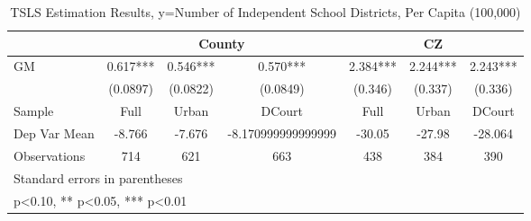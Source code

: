 \begin{table}[htbp]\centering
\def\sym#1{\ifmmode^{#1}\else\(^{#1}\)\fi}
\caption{TSLS Estimation Results, y=Number of Independent School Districts, Per Capita (100,000)}
\begin{tabular}{l*{6}{c}}
\toprule
                &\multicolumn{3}{c}{County}            &\multicolumn{3}{c}{CZ}                \\\cmidrule(lr){2-4}\cmidrule(lr){5-7}
\midrule
GM              &    0.617***&    0.546***&    0.570***&    2.384***&    2.244***&    2.243***\\
                & (0.0897)   & (0.0822)   & (0.0849)   &  (0.346)   &  (0.337)   &  (0.336)   \\
\midrule
Sample          &     Full   &    Urban   &   DCourt   &     Full   &    Urban   &   DCourt   \\
Dep Var Mean    &   -8.766   &   -7.676   &-8.170999999999999   &   -30.05   &   -27.98   &  -28.064   \\
Observations    &      714   &      621   &      663   &      438   &      384   &      390   \\
\bottomrule
\multicolumn{7}{l}{\footnotesize Standard errors in parentheses}\\
\multicolumn{7}{l}{\footnotesize * p<0.10, ** p<0.05, *** p<0.01}\\
\end{tabular}
\end{table}
